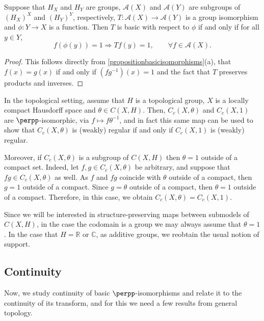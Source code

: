 \begin{proposition}\label{propositionbasicnessofgroupvalued}
Suppose that $H_X$ and $H_Y$ are groups, $\mathcal{A}(X)$ and $\mathcal{A}(Y)$ are subgroups of $(H_X)^X$ and $(H_Y)^Y$, respectively, $T:\mathcal{A}(X)\to\mathcal{A}(Y)$ is a group isomorphism and $\phi:Y\to X$ is a function. Then $T$ is basic with respect to $\phi$ if and only if for all $y\in Y$,
\[f(\phi(y))=1\Longrightarrow Tf(y)=1,\qquad\forall f\in\mathcal{A}(X).\]
\end{proposition}
\begin{proof}
This follows directly from \ref{propositionbasicisomorphisms}(a), that $f(x)=g(x)$ if and only if $(fg^{-1})(x)=1$ and the fact that $T$ preserves products and inverses.\qedhere
\end{proof}

In the topological setting, assume that $H$ is a topological group, $X$ is a locally compact Hausdorff space and $\theta\in C(X,H)$. Then, $C_c(X,\theta)$ and $C_c(X,1)$ are $\perpp$-isomorphic, via $f\mapsto f\theta^{-1}$, and in fact this same map can be used to show that $C_c(X,\theta)$ is (weakly) regular if and only if $C_c(X,1)$ is (weakly) regular.

Moreover, if $C_c(X,\theta)$ is a subgroup of $C(X,H)$ then $\theta=1$ outside of a compact set. Indeed, let $f,g\in C_c(X,\theta)$ be arbitrary, and suppose that $fg\in C_c(X,\theta)$ as well. As $f$ and $fg$ coincide with $\theta$ outside of a compact, then $g=1$ outside of a compact. Since $g=\theta$ outside of a compact, then $\theta=1$ outside of a compact. Therefore, in this case, we obtain $C_c(X,\theta)=C_c(X,1)$.

Since we will be interested in structure-preserving maps between submodels of $C(X,H)$, in the case the codomain is a group we may always assume that $\theta=1$. In the case that $H=\mathbb{R}$ or $\mathbb{C}$, as additive groups, we reobtain the usual notion of support.

\subsection{Continuity}

Now, we study continuity of basic $\perpp$-isomorphisms and relate it to the continuity of its transform, and for this we need a few results from general topology.

